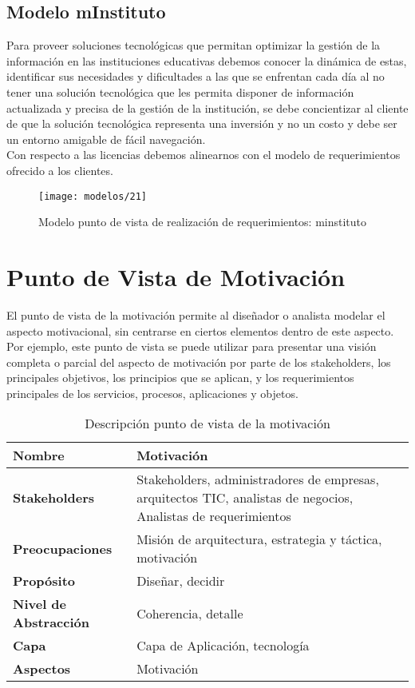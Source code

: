    \subsection{Modelo mInstituto}
   Para proveer soluciones tecnológicas que permitan optimizar la gestión de la información en las instituciones educativas debemos conocer la dinámica de estas, identificar sus necesidades y dificultades a las que se enfrentan cada día al no tener una solución tecnológica que les permita disponer de información actualizada y precisa de la gestión de la institución, se debe concientizar al cliente de que la solución tecnológica representa una inversión y no un costo y debe ser un entorno amigable de fácil navegación. \\
   
   Con respecto a las licencias debemos alinearnos con el modelo de requerimientos ofrecido a los clientes.

   \begin{figure}[H]
   	\centering
   	\texttt{[image: modelos/21]}
   	\captionsetup{width=.95\textwidth}
   	\caption{Modelo punto de vista de realización de requerimientos: minstituto}
   	\label{modelo21}
   \end{figure}
   
\section{Punto de Vista de Motivación}
El punto de vista de la motivación permite al diseñador o analista modelar el aspecto motivacional, sin centrarse en ciertos elementos dentro de este aspecto. Por ejemplo, este punto de vista se puede utilizar para presentar una visión completa o parcial del aspecto de motivación por parte de los stakeholders, los principales objetivos, los principios que se aplican, y los requerimientos principales de los servicios, procesos, aplicaciones y objetos.

   \begin{table}[H]
   	\centering
   	\begin{tabular}{p{3.7cm}p{8cm}}
   		\hline
   		\rowcolor[HTML]{0073a1}
   		{\color[HTML]{FFFFFF} \textbf{Nombre}} & {\color[HTML]{FFFFFF} \textbf{Motivación}} \\
   		\hline
   		\textbf{Stakeholders} & Stakeholders, administradores de empresas, arquitectos TIC, analistas de negocios, Analistas de requerimientos \\
   		\textbf{Preocupaciones} & Misión de arquitectura, estrategia y táctica, motivación \\
   		\textbf{Propósito} & Diseñar, decidir \\
   		\textbf{Nivel de Abstracción} & Coherencia, detalle \\
   		\textbf{Capa} & Capa de Aplicación, tecnología \\
   		\textbf{Aspectos} & Motivación \\
   		\bottomrule
   	\end{tabular}
   	\captionsetup{width=.95\textwidth}
   	\caption{Descripción punto de vista de la motivación}
   	\label{tabla25}
   \end{table}
   
